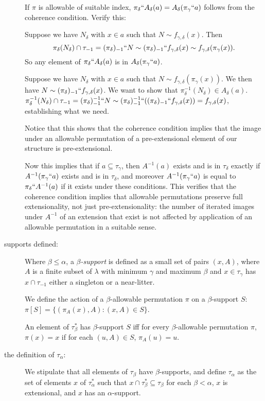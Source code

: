 \documentclass[112pt]{article}
\begin{document}
\begin{description}
If $\pi$ is allowable of suitable index, $\pi_\delta``A_\delta(a)= A_\delta(\pi_\gamma``a)$ follows from the coherence condition.  Verify this:

Suppose we have $N_\delta$ with $x \in a$ such that $N \sim f_{\gamma,\delta}(x)$.  Then $$\pi_\delta(N_\delta)  \cap \tau_{-1} = (\pi_\delta)_{-1}``N \sim (\pi_\delta)_{-1}``f_{\gamma,\delta}(x) \sim f_{\gamma,\delta}(\pi_\gamma(x)).$$  So any element of $\pi_\delta``A_\delta(a)$ is in $A_\delta(\pi_\gamma``a)$.

Suppose we have $N_\delta$ with $x \in a$ such that $N \sim f_{\gamma,\delta}(\pi_\gamma(x))$.  We then have $N \sim (\pi_\delta)_{-1}``f_{\gamma,\delta}(x)$.  We want to show that $\pi_\delta^{-1}(N_\delta) \in A_\delta(a)$.  $\pi_\delta^{-1}(N_\delta) \cap \tau_{-1} = (\pi_\delta)_{-1}^{-1}``N \sim 
(\pi_\delta)_{-1}^{-1}``((\pi_\delta)_{-1}``f_{\gamma,\delta}(x)) = f_{\gamma,\delta}(x)$, establishing what we need.

Notice that this shows that the coherence condition implies that the image under an allowable permutation of a pre-extensional element of our structure is pre-extensional.

Now this implies that if $a \subseteq \tau_\gamma$, then $A^{-1}(a)$ exists and is in $\tau_\delta$ exactly if $A^{-1}(\pi_\gamma``a)$ exists and is in $\tau_\delta$, and moreover $A^{-1}(\pi_\gamma``a)$ is equal to $\pi_\delta``A^{-1}(a)$ if it exists under these conditions.  This verifies that the coherence condition implies that allowable permutations preserve full extensionality, not just pre-extensionality:  the number of iterated images under $A^{-1}$ of an extension that exist is not affected by application of an allowable permutation in a suitable sense.

\item[supports defined:]  Where $\beta \leq \alpha$, a {\em $\beta$-support\/} is defined as a small set of pairs $(x,A)$, where $A$ is a finite subset of $\lambda$ with minimum $\gamma$ and maximum $\beta$ and $x \in \tau_\gamma$ has $x \cap \tau_{-1}$ either a singleton or a near-litter.

We define the action of a $\beta$-allowable permutation $\pi$ on a $\beta$-support $S$:  $\pi[S]= \{(\pi_A(x),A):(x,A) \in S\}$.

An element of $\tau^*_\beta$ has $\beta$-support $S$ iff for every $\beta$-allowable permutation $\pi$,  $\pi(x)=x$ if  for each $(u,A) \in S$,  $\pi_A(u) = u$.

\item[the definition of $\tau_\alpha$:]  We stipulate that all elements of $\tau_\beta$ have $\beta$-supports, and define $\tau_\alpha$ as the set of elements $x$ of $\tau^*_\alpha$ such that
$x \cap \tau^*_{\beta} \subseteq \tau_\beta$ for each $\beta<\alpha$, $x$ is extensional, and $x$ has an $\alpha$-support.


\end{description}
\end{document}
